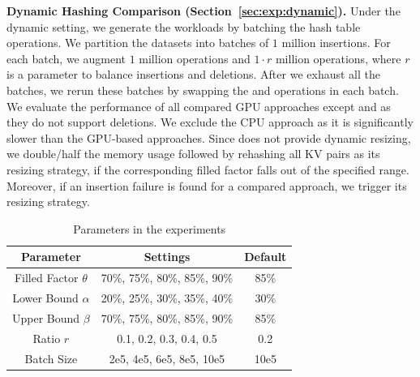 

\vspace{1mm}\noindent\textbf{Dynamic Hashing Comparison (Section~\ref{sec:exp:dynamic}).}
Under the dynamic setting, we generate the workloads by batching the hash table operations. 
We partition the datasets into batches of $1$ million insertions. 
For each batch, we augment $1$ million  operations and $1 \cdot r$ million  operations,
where $r$ is a parameter to balance insertions and deletions.
After we exhaust all the batches, we rerun these batches by swapping the  and  operations in each batch. 
We evaluate the performance of all compared GPU approaches except \cudpp and \warp as they do not support deletions. 
We exclude the CPU approach as it is significantly slower than the GPU-based approaches. 
Since \megakv does not provide dynamic resizing, we double/half the memory usage followed by rehashing all KV pairs as its resizing strategy, if the corresponding filled factor falls out of the specified range. 
Moreover, if an insertion failure is found for a compared approach, we trigger its resizing strategy.

\begin{table}[t]
	\centering
	\caption{Parameters in the experiments}
	\vspace{-1.5em}
	\label{tbl:parameters}
	\begin{tabular}{|c|c|c|}
		\hline
		\textbf{Parameter} & \textbf{Settings} & \textbf{Default} \\ \hline
		Filled Factor	$\theta$  & 70\%, 75\%, 80\%, 85\%, 90\% & 85\% \\ \hline
		Lower Bound $\alpha$ & 20\%, 25\%, 30\%, 35\%, 40\% & 30\% \\ \hline
		Upper Bound	$\beta$  & 70\%, 75\%, 80\%, 85\%, 90\% & 85\% \\ \hline
		Ratio $r$ & 0.1, 0.2, 0.3, 0.4, 0.5 & 0.2 \\ \hline
		Batch Size & 2e5, 4e5, 6e5, 8e5, 10e5 & 10e5 \\ \hline
	\end{tabular}
\end{table}

